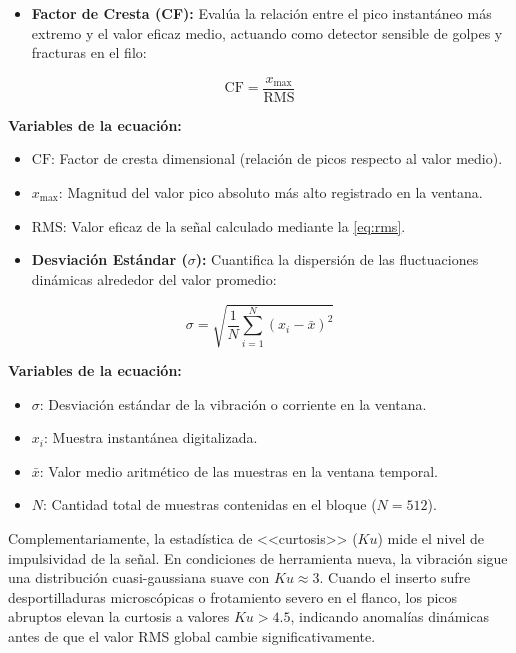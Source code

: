 \begin{itemize}
    \item \textbf{Factor de Cresta (CF):} Evalúa la relación entre el pico instantáneo más extremo y el valor eficaz medio, actuando como detector sensible de golpes y fracturas en el filo:
\end{itemize}

\begin{equation}
\text{CF} = \frac{x_{\max}}{\text{RMS}}
\label{eq:factor_cresta}
\end{equation}

\noindent\textbf{Variables de la ecuación:}
\begin{itemize}
    \item $\text{CF}$: Factor de cresta dimensional (relación de picos respecto al valor medio).
    \item $x_{\max}$: Magnitud del valor pico absoluto más alto registrado en la ventana.
    \item $\text{RMS}$: Valor eficaz de la señal calculado mediante la \eqref{eq:rms}.
\end{itemize}

\begin{itemize}
    \item \textbf{Desviación Estándar ($\sigma$):} Cuantifica la dispersión de las fluctuaciones dinámicas alrededor del valor promedio:
\end{itemize}

\begin{equation}
\sigma = \sqrt{\frac{1}{N} \sum_{i=1}^{N} (x_i - \bar{x})^2}
\label{eq:desviacion_estandar}
\end{equation}

\noindent\textbf{Variables de la ecuación:}
\begin{itemize}
    \item $\sigma$: Desviación estándar de la vibración o corriente en la ventana.
    \item $x_i$: Muestra instantánea digitalizada.
    \item $\bar{x}$: Valor medio aritmético de las muestras en la ventana temporal.
    \item $N$: Cantidad total de muestras contenidas en el bloque ($N=512$).
\end{itemize}

Complementariamente, la estadística de <<curtosis>> ($Ku$) mide el nivel de impulsividad de la señal. En condiciones de herramienta nueva, la vibración sigue una distribución cuasi-gaussiana suave con $Ku \approx 3$. Cuando el inserto sufre desportilladuras microscópicas o frotamiento severo en el flanco, los picos abruptos elevan la curtosis a valores $Ku > 4.5$, indicando anomalías dinámicas antes de que el valor RMS global cambie significativamente.

